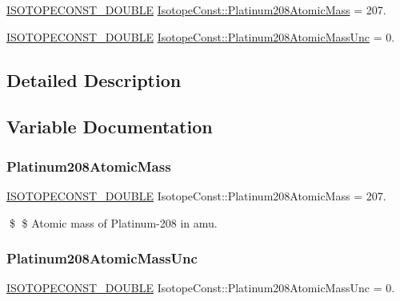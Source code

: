 \begin{DoxyCompactItemize}
\item 
\mbox{\hyperlink{group___isotope_const-_macros_ga8f45a7272ce02c0b4c65c44636ed719a}{I\+S\+O\+T\+O\+P\+E\+C\+O\+N\+S\+T\+\_\+\+D\+O\+U\+B\+LE}} \mbox{\hyperlink{group___isotope_const-_platinum-_pt208_gae44ae4c2be4a47314d14674884788044}{Isotope\+Const\+::\+Platinum208\+Atomic\+Mass}} = 207.
\item 
\mbox{\hyperlink{group___isotope_const-_macros_ga8f45a7272ce02c0b4c65c44636ed719a}{I\+S\+O\+T\+O\+P\+E\+C\+O\+N\+S\+T\+\_\+\+D\+O\+U\+B\+LE}} \mbox{\hyperlink{group___isotope_const-_platinum-_pt208_ga027541c9d2c268eda37ea8cebc9a2047}{Isotope\+Const\+::\+Platinum208\+Atomic\+Mass\+Unc}} = 0.
\end{DoxyCompactItemize}


\subsection{Detailed Description}


\subsection{Variable Documentation}
\mbox{\label{group___isotope_const-_platinum-_pt208_gae44ae4c2be4a47314d14674884788044}} 
\subsubsection{\texorpdfstring{Platinum208\+Atomic\+Mass}{Platinum208AtomicMass}}
{\footnotesize\ttfamily \mbox{\hyperlink{group___isotope_const-_macros_ga8f45a7272ce02c0b4c65c44636ed719a}{I\+S\+O\+T\+O\+P\+E\+C\+O\+N\+S\+T\+\_\+\+D\+O\+U\+B\+LE}} Isotope\+Const\+::\+Platinum208\+Atomic\+Mass = 207.}

\$ \$ Atomic mass of Platinum-\/208 in amu. \mbox{\label{group___isotope_const-_platinum-_pt208_ga027541c9d2c268eda37ea8cebc9a2047}} 
\subsubsection{\texorpdfstring{Platinum208\+Atomic\+Mass\+Unc}{Platinum208AtomicMassUnc}}
{\footnotesize\ttfamily \mbox{\hyperlink{group___isotope_const-_macros_ga8f45a7272ce02c0b4c65c44636ed719a}{I\+S\+O\+T\+O\+P\+E\+C\+O\+N\+S\+T\+\_\+\+D\+O\+U\+B\+LE}} Isotope\+Const\+::\+Platinum208\+Atomic\+Mass\+Unc = 0.}

